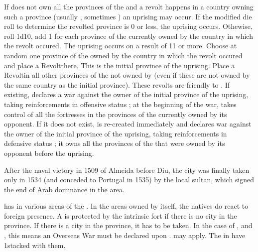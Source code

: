 \label{chSpecific:Persia:uprising}
\bparag If  does not own all the provinces of the 
and a revolt happens %
in a country owning such a province (usually \TUR, sometimes \RUS) an uprising
may occur.
\bparag If the modified die roll to determine the revolted
province is 0 or less, the uprising occurs.
\bparag Othewise, roll 1d10, add 1 for each province of the 
currently owned by the country in which the revolt occured. The uprising
occurs on a result of 11 or more.
\aparag Choose at random one province of the  owned by the
country in which the revolt occured and place a Revolt\faceplus there. This
is the initial province of the uprising.
\bparag Place a Revolt\facemoins in all other provinces of the 
not owned by  (even if these are not owned by the same country as
the initial province).
\bparag These revolts are friendly to .
\aparag If existing,  declares a war against the owner of the initial
province of the uprising, taking reinforcements in offensive status ;
\bparag at the beginning of the war,  takes control of all the
fortresses in the provinces of the  currently owned by its
opponent.
\aparag If it does not exist,  is re-created immediately and
declares war against the owner of the initial province of the uprising, taking
reinforcements in defensive status ;
\bparag it owns all the provinces of the  that were owned by its
opponent before the uprising.

\begin{histoire}
  After the naval victory in 1509 of Almeida before Diu, the city was
  finally taken only in 1534 (and conceded to Portugal in 1535) by the
  local sultan, which signed the end of Arab dominance in the area.
\end{histoire}
  has \TP in various areas of
the \ROTW.
\bparag In the areas owned by itself, the natives do react to foreign
presence.
\bparag A \TP is protected by the intrinsic fort if there is no city in
the province.
\bparag If there is a city in the province, it has to be taken. In the
case of ,  and , this
means an Overseas War must be declared upon .
\bparag {} may apply.
\bparag The \TP in  have 1\LD stacked with them.

